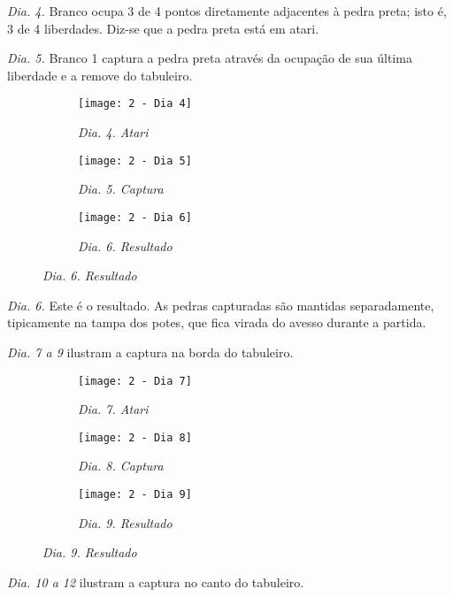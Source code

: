 \emph{Dia. 4.} Branco ocupa 3 de 4 pontos diretamente adjacentes à pedra preta; isto é, 3 de 4 liberdades. Diz-se que a pedra preta está em atari.

\emph{Dia. 5.} Branco 1 captura a pedra preta através da ocupação de sua última liberdade e a remove do tabuleiro.

\begin{figure}[h]
    \centering
    \begin{subfigure}{.3\textwidth}
        \centering
        \texttt{[image: 2 - Dia 4]}
        \caption*{\emph{Dia. 4. Atari}}
    \end{subfigure}
    \begin{subfigure}{.3\textwidth}
        \centering
        \texttt{[image: 2 - Dia 5]}
        \caption*{\emph{Dia. 5. Captura}}
    \end{subfigure}
    \begin{subfigure}{.3\textwidth}
        \centering
        \texttt{[image: 2 - Dia 6]}
        \caption*{\emph{Dia. 6. Resultado}}
    \end{subfigure}
\end{figure}

\emph{Dia. 6.} Este é o resultado. As pedras capturadas são mantidas separadamente, tipicamente na tampa dos potes, que fica virada do avesso durante a partida.

\emph{Dia. 7 a 9} ilustram a captura na borda do tabuleiro.

\begin{figure}[h]
    \centering
    \begin{subfigure}{.3\textwidth}
        \centering
        \texttt{[image: 2 - Dia 7]}
        \caption*{\emph{Dia. 7. Atari}}
    \end{subfigure}
    \begin{subfigure}{.3\textwidth}
        \centering
        \texttt{[image: 2 - Dia 8]}
        \caption*{\emph{Dia. 8. Captura}}
    \end{subfigure}
    \begin{subfigure}{.3\textwidth}
        \centering
        \texttt{[image: 2 - Dia 9]}
        \caption*{\emph{Dia. 9. Resultado}}
    \end{subfigure}
\end{figure}

\pagebreak

\emph{Dia. 10 a 12} ilustram a captura  no canto do tabuleiro.

